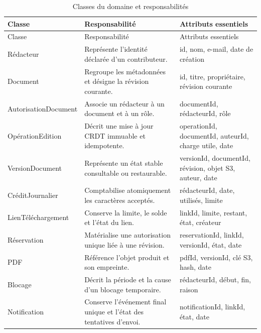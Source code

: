 \begingroup\small\setlength{\tabcolsep}{3pt}\renewcommand{\arraystretch}{1.25}
\begin{longtable}{|P{.28\textwidth}|P{.34\textwidth}|P{.31\textwidth}|}
\caption{Classes du domaine et responsabilités}\\
\hline
Classe & Responsabilité & Attributs essentiels \\ \hline
\endfirsthead
\hline
Classe & Responsabilité & Attributs essentiels \\ \hline
\endhead
\endfoot

Rédacteur & Représente l'identité déclarée d'un contributeur. & id, nom, e-mail, date de création \\ \hline

Document & Regroupe les métadonnées et désigne la révision courante. & id, titre, propriétaire, révision courante \\ \hline

Autorisation\allowbreak Document & Associe un rédacteur à un document et à un rôle. & documentId, rédacteurId, rôle \\ \hline

OpérationEdition & Décrit une mise à jour CRDT immuable et idempotente. & operationId, documentId, auteurId, charge utile, date \\ \hline

VersionDocument & Représente un état stable consultable ou restaurable. & versionId, documentId, révision, objet S3, auteur, date \\ \hline

CréditJournalier & Comptabilise atomiquement les caractères acceptés. & rédacteurId, date, utilisés, limite \\ \hline

Lien\allowbreak Téléchargement & Conserve la limite, le solde et l'état du lien. & linkId, limite, restant, état, créateur \\ \hline

Réservation & Matérialise une autorisation unique liée à une révision. & reservationId, linkId, versionId, état, date \\ \hline

PDF & Référence l'objet produit et son empreinte. & pdfId, versionId, clé S3, hash, date \\ \hline

Blocage & Décrit la période et la cause d'un blocage temporaire. & rédacteurId, début, fin, raison \\ \hline

Notification & Conserve l'événement final unique et l'état des tentatives d'envoi. & notificationId, linkId, état, date \\ \hline

\end{longtable}\endgroup

